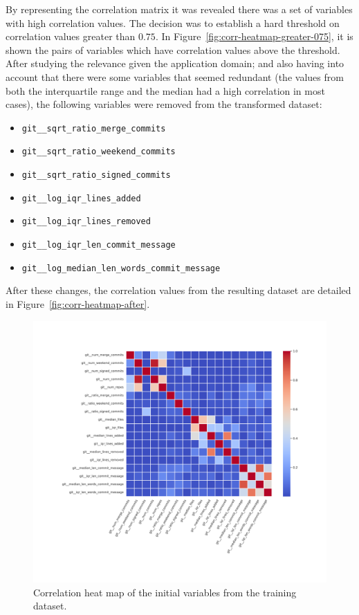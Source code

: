 \documentclass[a4paper, 12pt]{book}
\begin{document}
By representing the correlation matrix it was revealed there was a set of variables with high correlation values. The decision was to establish a hard threshold on correlation values greater than $0.75$. In Figure~\ref{fig:corr-heatmap-greater-075}, it is shown the pairs of variables which have correlation values above the threshold. After studying the relevance given the application domain; and also having into account that there were some variables that seemed redundant (the values from both the interquartile range and the median had a high correlation in most cases), the following variables were removed from the transformed dataset: 
\begin{itemize}
\item \texttt{git\_\_sqrt\_ratio\_merge\_commits}
\item \texttt{git\_\_sqrt\_ratio\_weekend\_commits}
\item \texttt{git\_\_sqrt\_ratio\_signed\_commits}
\item \texttt{git\_\_log\_iqr\_lines\_added}
\item \texttt{git\_\_log\_iqr\_lines\_removed}
\item \texttt{git\_\_log\_iqr\_len\_commit\_message}
\item \texttt{git\_\_log\_median\_len\_words\_commit\_message}
\end{itemize}

After these changes, the correlation values from the resulting dataset are detailed in Figure~\ref{fig:corr-heatmap-after}.



\begin{figure}
 \centering
  \includegraphics[width=18cm, keepaspectratio]{img/eda_corr_heatmap_before.png}
  \caption{Correlation heat map of the initial variables from the training dataset.}
  \label{fig:corr-heatmap-before}
\end{figure}
\end{document}

